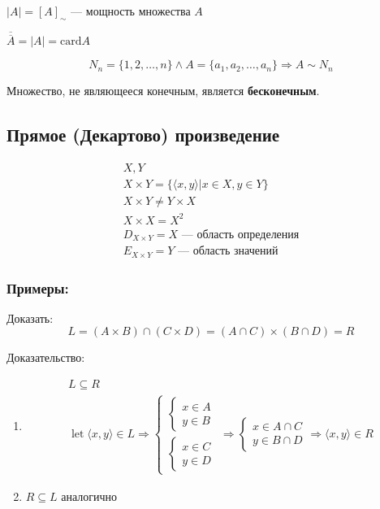 \documentclass{article}
\DeclareMathOperator*{\Let}{let}
\begin{document}
$|A| = [A]_{\sim}$ --- мощность множества $A$

$\overline{\overline{A}} = |A| = \text{card} A$

\[
	N_n = \{1, 2, \dots, n\} \land A = \{a_1, a_2, \dots, a_n \} \Rightarrow A \sim N_n
\]

Множество, не являющееся конечным, является \textbf{бесконечным}.

\subsection{Прямое (Декартово) произведение}
\begin{gather*}
	X, Y \\
	X \times Y = \{ \langle x, y \rangle | x \in X, y \in Y \} \\
	X \times Y \ne Y \times X \\
	X \times X = X^2 \\
	D_{X \times Y} = X \text{ --- область определения} \\
	E_{X \times Y} = Y \text{ --- область значений}
\end{gather*}

\subsubsection*{Примеры:}

Доказать:
\[
L = (A \times B) \cap (C \times D) = (A \cap C) \times (B \cap D) = R
\]

Доказательство:
\begin{enumerate}
	\item \begin{gather*}
		L \subseteq R \\
		\Let \langle x, y \rangle \in L \Rightarrow
		\begin{cases}
			\begin{cases}
				x \in A \\
				y \in B
			\end{cases} \\
			\begin{cases}
				x \in C \\
				y \in D
			\end{cases}
		\end{cases} \Rightarrow
		\begin{cases}
			x \in A \cap C \\
			y \in B \cap D
		\end{cases} \Rightarrow
		\langle x, y \rangle \in R
	\end{gather*}
	\item $R \subseteq L$ аналогично
\end{enumerate}
\end{document}
